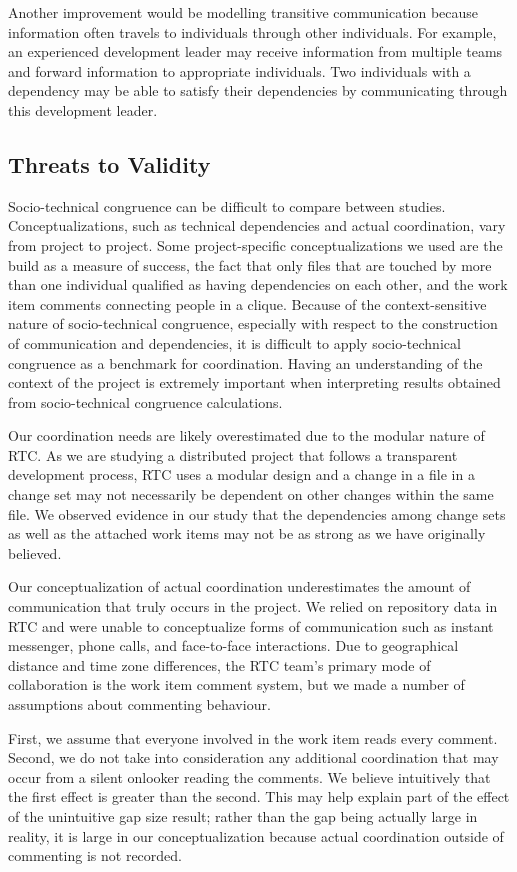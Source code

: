 Another improvement would be modelling transitive communication because information often travels to individuals through other individuals. For example, an experienced development leader may receive information from multiple teams and forward information to appropriate individuals. Two individuals with a dependency may be able to satisfy their dependencies by communicating through this development leader.

\subsection{Threats to Validity}
\label{sec:threats}
Socio-technical congruence can be difficult to compare between studies. Conceptualizations, such as technical dependencies and actual coordination, vary from project to project. Some project-specific conceptualizations we used are the build as a measure of success, the fact that only files that are touched by more than one individual qualified as having dependencies on each other, and the work item comments connecting people in a clique.
Because of the context-sensitive nature of socio-technical congruence, especially with respect to the construction of communication and dependencies, it is difficult to apply socio-technical congruence as a benchmark for coordination. Having an understanding of the context of the project is extremely important when interpreting results obtained from socio-technical congruence calculations.

Our coordination needs are likely overestimated due to the modular nature of RTC.
As we are studying a distributed project that follows a transparent development process, RTC uses a modular design \cite{maccormack2006} and a change in a file in a change set may not necessarily be dependent on other changes within the same file. 
We observed evidence in our study that the dependencies among change sets as well as the attached work items may not be as strong as we have originally believed.

Our conceptualization of actual coordination underestimates the amount of communication that truly occurs in the project. 
We relied on repository data in RTC and were unable to conceptualize forms of communication such as instant messenger, phone calls, and face-to-face interactions.
Due to geographical distance and time zone differences, the RTC team's primary mode of collaboration is the work item comment system, but we made a number of assumptions about commenting behaviour.

First, we assume that everyone involved in the work item reads every comment. Second, we do not take into consideration any additional coordination that may occur from a silent onlooker reading the comments. We believe intuitively that the first effect is greater than the second.
This may help explain part of the effect of the unintuitive gap size result; rather than the gap being actually large in reality, it is large in our conceptualization because actual coordination outside of commenting is not recorded.

